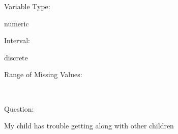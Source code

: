 \documentclass[
]{article}
\begin{document}
\begin{minipage}[t]{0.3\linewidth}

Variable Type:

\end{minipage}%
\begin{minipage}[t]{0.7\linewidth}

numeric

\end{minipage}

\begin{minipage}[t]{0.3\linewidth}

Interval:

\end{minipage}%
\begin{minipage}[t]{0.7\linewidth}

discrete

\end{minipage}

\begin{minipage}[t]{0.3\linewidth}

Range of Missing Values:

\end{minipage}%
\begin{minipage}[t]{0.7\linewidth}

~

\end{minipage}

\begin{minipage}[t]{0.3\linewidth}

Question:

\end{minipage}%
\begin{minipage}[t]{0.7\linewidth}

My child has trouble getting along with other children

\end{minipage}
\end{document}
